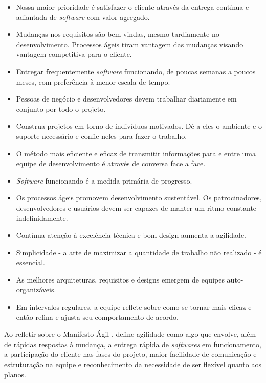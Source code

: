 \documentclass[
    12pt,       %
    openright,      %
    twoside,      %
    a4paper,      %
    english,      %
    french,       %
    spanish,      %
    brazil,       %
    ]{abntex2}
\begin{document}
\begin{itemize}
        \item Nossa maior prioridade é satisfazer o cliente através da entrega contínua e adiantada de \textit{software} com valor agregado.
        \item Mudanças nos requisitos são bem-vindas, mesmo tardiamente no desenvolvimento. Processos ágeis tiram vantagem das mudanças visando vantagem competitiva para o cliente.
        \item Entregar frequentemente \textit{software} funcionando, de poucas semanas a poucos meses, com preferência à menor escala de tempo.
        \item Pessoas de negócio e desenvolvedores devem trabalhar diariamente em conjunto por todo o projeto.
        \item Construa projetos em torno de indivíduos motivados. Dê a eles o ambiente e o suporte necessário e confie neles para fazer o trabalho.
        \item O método mais eficiente e eficaz de transmitir informações para e entre uma equipe de desenvolvimento é através de conversa face a face.
        \item \textit{Software} funcionando é a medida primária de progresso.
        \item Os processos ágeis promovem desenvolvimento sustentável. Os patrocinadores, desenvolvedores e usuários devem ser capazes de manter um ritmo constante indefinidamente.
        \item Contínua atenção à excelência técnica e bom design aumenta a agilidade.
        \item Simplicidade - a arte de maximizar a quantidade de trabalho não realizado - é essencial.
        \item As melhores arquiteturas, requisitos e designs emergem de equipes auto-organizáveis.
        \item Em intervalos regulares, a equipe reflete sobre como se tornar mais eficaz e então refina e ajusta seu comportamento de acordo.
\end{itemize}

Ao refletir sobre o Manifesto Ágil \cite{AGILEMANIFEST:2001},  define agilidade como algo que envolve, além de rápidas respostas à mudança, a entrega rápida de \textit{softwares} em funcionamento, a participação do cliente nas fases do projeto, maior facilidade de comunicação e estruturação na equipe e reconhecimento da necessidade de ser flexível quanto aos planos.
\end{document}
